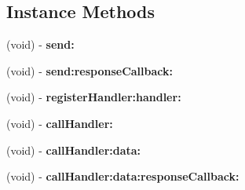 \subsection*{Instance Methods}
\begin{DoxyCompactItemize}
\item 
\mbox{\label{interface_web_view_javascript_bridge_a3ed51be4c35d6745a0fd9cd114df73ce}} 
(void) -\/ {\bfseries send\+:}
\item 
\mbox{\label{interface_web_view_javascript_bridge_ab75f7022e1cfaddc374583676bf2488c}} 
(void) -\/ {\bfseries send\+:response\+Callback\+:}
\item 
\mbox{\label{interface_web_view_javascript_bridge_a34a4cf5d82916061533717f29a347ece}} 
(void) -\/ {\bfseries register\+Handler\+:handler\+:}
\item 
\mbox{\label{interface_web_view_javascript_bridge_a96c3ac4d03d320c727993578d84db56e}} 
(void) -\/ {\bfseries call\+Handler\+:}
\item 
\mbox{\label{interface_web_view_javascript_bridge_a3ea24ac2e5186c8fbf27102db6cd0791}} 
(void) -\/ {\bfseries call\+Handler\+:data\+:}
\item 
\mbox{\label{interface_web_view_javascript_bridge_abe45b326b829f9fad04a1fd5d92c5d44}} 
(void) -\/ {\bfseries call\+Handler\+:data\+:response\+Callback\+:}
\end{DoxyCompactItemize}
